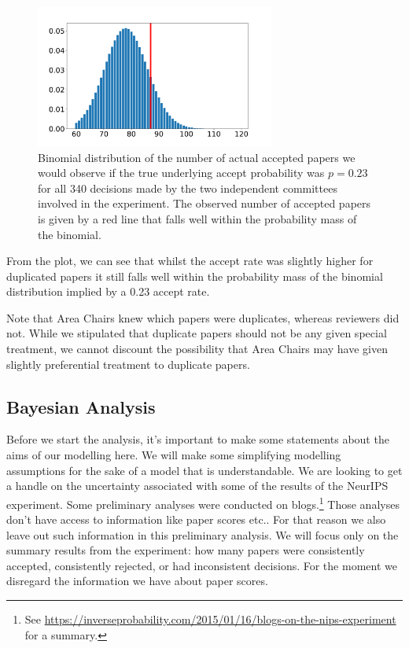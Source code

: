 \begin{figure}[htb]
\centering
\includegraphics[width=0.70\textwidth]{diagrams/neurips/uncertainty-accept-rate.pdf}


\caption{Binomial distribution of the number of actual accepted papers we would observe if the true underlying accept probability was $p=0.23$ for all 340 decisions made by the two independent committees involved in the experiment. The observed number of accepted papers is given by a red line that falls well within the probability mass of the binomial.}
\label{fig:uncertainty-accept-rate}
\end{figure}

From the plot, we can see that whilst the accept rate was slightly
higher for duplicated papers it still falls well within the 
probability mass of the binomial distribution implied by a 0.23 accept rate.

Note that Area Chairs knew which papers were duplicates, whereas
reviewers did not. While we stipulated that duplicate papers should not
be any given special treatment, we cannot discount the possibility that
Area Chairs may have given slightly preferential treatment to duplicate
papers.

\subsection{Bayesian Analysis}\label{bayesian-analysis}

Before we start the analysis, it's important to make some statements
about the aims of our modelling here. We will make some simplifying
modelling assumptions for the sake of a model that is understandable. We
are looking to get a handle on the uncertainty associated with some of
the results of the NeurIPS experiment.
Some
preliminary analyses were conducted on blogs.\footnote{See \url{https://inverseprobability.com/2015/01/16/blogs-on-the-nips-experiment} for a summary.} Those
analyses don't have access to information like paper scores etc.. For
that reason we also leave out such information in this preliminary
analysis. We will focus only on the summary results from the experiment:
how many papers were consistently accepted, consistently rejected, or
had inconsistent decisions. For the moment we disregard the information
we have about paper scores.

